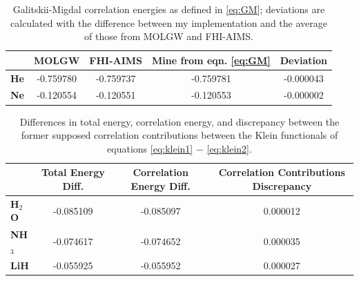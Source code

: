 \documentclass[12pt]{caltech_thesis}
\begin{document}
\begin{table}[h!]
    \centering
    \begin{tabular}{lcccc}
        \toprule
        & \textbf{MOLGW} & \textbf{FHI-AIMS} & \textbf{Mine from eqn. \ref{eq:GM}} & \textbf{Deviation} \\
        \midrule
        \textbf{He} & -0.759780 & -0.759737 & -0.759781 & -0.000043 \\
        \textbf{Ne} & -0.120554 & -0.120551 & -0.120553 & -0.000002 \\
        \bottomrule
    \end{tabular}
    \caption{Galitskii-Migdal correlation energies as defined in \ref{eq:GM}; deviations are calculated with the difference between my implementation and the average of those from MOLGW and FHI-AIMS.}
    \label{tab:galitskii}
\end{table}



\begin{table}[h!]
\centering
\begin{tabular}{lccc}
\toprule
& \textbf{Total Energy Diff.} & \textbf{Correlation Energy Diff.} & \textbf{Correlation Contributions Discrepancy} \\
\midrule
\textbf{H$_2$O} & -0.085109 & -0.085097 & 0.000012 \\
\textbf{NH$_3$} & -0.074617 & -0.074652 & 0.000035 \\
\textbf{LiH} & -0.055925 & -0.055952 & 0.000027 \\
\bottomrule
\end{tabular}
\caption{Differences in total energy, correlation energy, and discrepancy between the former supposed correlation contributions between the Klein functionals of equations \ref{eq:klein1} $-$ \ref{eq:klein2}.}
\label{tab:klein}
\end{table}
\end{document}
